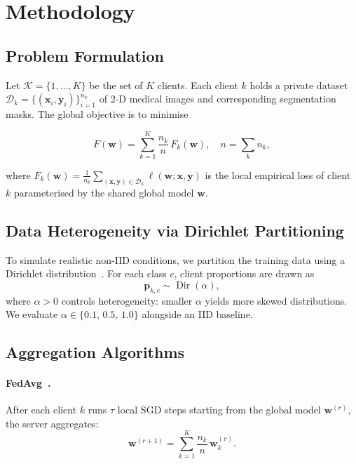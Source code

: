 \section{Methodology}
\label{sec:method}

\subsection{Problem Formulation}

Let $\mathcal{K} = \{1,\ldots,K\}$ be the set of $K$ clients.
Each client $k$ holds a private dataset
$\mathcal{D}_k = \{(\mathbf{x}_i,\mathbf{y}_i)\}_{i=1}^{n_k}$
of 2-D medical images and corresponding segmentation masks.
The global objective is to minimise

\begin{equation}
  F(\mathbf{w}) = \sum_{k=1}^{K} \frac{n_k}{n}\, F_k(\mathbf{w}),
  \quad n = \textstyle\sum_k n_k,
  \label{eq:global_obj}
\end{equation}

where $F_k(\mathbf{w}) = \frac{1}{n_k}\sum_{(\mathbf{x},\mathbf{y})\in\mathcal{D}_k}\ell(\mathbf{w};\mathbf{x},\mathbf{y})$
is the local empirical loss of client $k$ parameterised by the shared
global model $\mathbf{w}$.

\subsection{Data Heterogeneity via Dirichlet Partitioning}

To simulate realistic non-IID conditions, we partition the training data
using a Dirichlet distribution~\cite{hsu2019federated}.
For each class $c$, client proportions are drawn as
\begin{equation}
  \mathbf{p}_{k,c} \sim \operatorname{Dir}(\alpha),
  \label{eq:dirichlet}
\end{equation}
where $\alpha > 0$ controls heterogeneity: smaller $\alpha$ yields more
skewed distributions.
We evaluate $\alpha \in \{0.1,\, 0.5,\, 1.0\}$ alongside an IID baseline.

\subsection{Aggregation Algorithms}

\paragraph{FedAvg~\cite{mcmahan2017fedavg}.}
After each client $k$ runs $\tau$ local SGD steps starting from the global
model $\mathbf{w}^{(r)}$, the server aggregates:
\begin{equation}
  \mathbf{w}^{(r+1)} = \sum_{k=1}^{K} \frac{n_k}{n}\,\mathbf{w}_k^{(r)}.
  \label{eq:fedavg}
\end{equation}

